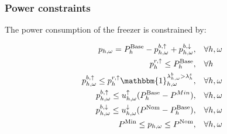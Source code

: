 {\subsubsection{Power constraints}\label{sec:power_constraints}

The power consumption of the freezer is constrained by:

\begin{subequations}\label{eq:power_constraints}
    \begin{align}
        p_{h,\omega} = P^{\text{Base}}_{h} - p^{b, \uparrow}_{h,\omega} + p^{b, \downarrow}_{h,\omega}, \quad                                                                                                 & \forall{h,\omega}                                                                             \label{con_power:subeq1}  \\
        p^{r, \uparrow}_h \leq P^{\text{Base}}_h, \quad                                                                                                                                                       & \forall{h}                                                                                     \label{con_power:subeq2} \\
        p^{b, \uparrow}_{h,\omega} \leq p^{r, \uparrow}_h \mathbbm{1}_{h,\omega}^{\lambda^{b}_{h,\omega} > \lambda^{s}_{h}} , \quad                                                                           & \forall{h,\omega}                                                                             \label{con_power:subeq3}  \\
        p^{b, \uparrow}_{h,\omega} \leq u_{h,\omega}^{\uparrow} (P^{\text{Base}}_{h} - P^{Min}) , \quad                                                                                                       & \forall{h,\omega}                                                                             \label{con_power:subeq4}  \\
        p^{b, \downarrow}_{h,\omega} \leq u^{\downarrow}_{h,\omega} (P^{\text{Nom}} -P^{\text{Base}}_{h}), \quad                                                                                              & \forall{h,\omega}                                                                             \label{con_power:subeq5}  \\
        P^{\text{Min}} \leq p_{h,\omega} \leq P^{\text{Nom}}, \quad                                                                                                                                           & \forall{h,\omega}                                                                             \label{con_power:subeq6}  \\

\end{align}
\end{subequations}}
